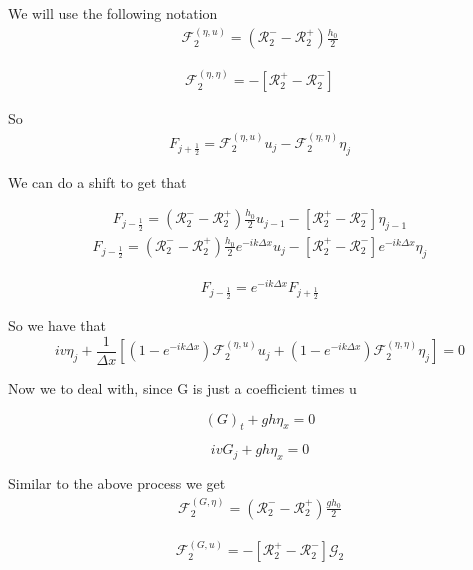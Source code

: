 \documentclass[12pt]{article}
\begin{document}
We will use the following notation
\begin{gather}
\mathcal{F}_2^{(\eta,u)} = \left( \mathcal{R}_2^-  - \mathcal{R}_2^+ \right) \frac{h_0}{2}
\end{gather}

\begin{gather}
\mathcal{F}_2^{(\eta,\eta)} = 
- \left [ \mathcal{R}_2^+ - \mathcal{R}_2^-\right ]
\end{gather}

So
\begin{gather}
F_{j+\frac{1}{2}} = \mathcal{F}_2^{(\eta,u)}u_j 
- \mathcal{F}_2^{(\eta,\eta)} \eta_j
\end{gather}


We can do a shift to get that 

\begin{gather}
F_{j-\frac{1}{2}} = \left( \mathcal{R}_2^-  - \mathcal{R}_2^+ \right) \frac{h_0}{2}u_{j-1} 
- \left [ \mathcal{R}_2^+ - \mathcal{R}_2^-\right ] \eta_{j-1}
\end{gather}
\begin{gather}
F_{j-\frac{1}{2}} = \left( \mathcal{R}_2^-  - \mathcal{R}_2^+ \right) \frac{h_0}{2} e^{-ik\Delta x}u_{j} 
- \left [ \mathcal{R}_2^+ - \mathcal{R}_2^-\right ] e^{-ik\Delta x}\eta_{j}
\end{gather}

\begin{gather}
F_{j-\frac{1}{2}} = e^{-ik\Delta x} F_{j+\frac{1}{2}}
\end{gather}

So we have that
\[iv\eta_j + \frac{1}{\Delta x}\left[\left(1 - e^{-ik\Delta x} \right)\mathcal{F}_2^{(\eta,u)}u_j 
+  \left(1 - e^{-ik\Delta x} \right)\mathcal{F}_2^{(\eta,\eta)} \eta_j\right] = 0\]

Now we to deal with, since G is just a coefficient times u

\[ \left(G\right)_t  + gh \eta_x  = 0\]

\[ ivG_j  + gh \eta_x  = 0\]

Similar to the above process we get
\begin{gather}
\mathcal{F}_2^{(G,\eta)} = \left( \mathcal{R}_2^-  - \mathcal{R}_2^+ \right) \frac{gh_0}{2}
\end{gather}

\begin{gather}
\mathcal{F}_2^{(G,u)} = 
- \left [ \mathcal{R}_2^+ - \mathcal{R}_2^-\right ] \mathcal{G}_2
\end{gather}
\end{document}
